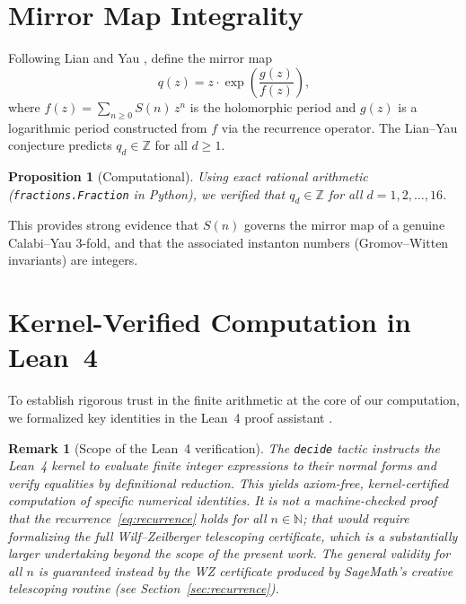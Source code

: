 \documentclass[11pt, a4paper]{article}
\newtheorem{proposition}[theorem]{Proposition}
\newtheorem{remark}[theorem]{Remark}
\begin{document}
\section{Mirror Map Integrality}\label{sec:mirrormap}

Following Lian and Yau \cite{LianYau1996}, define the mirror map
\[
  q(z) = z\cdot\exp\!\left(\frac{g(z)}{f(z)}\right),
\]
where $f(z)=\sum_{n\ge0}S(n)\,z^n$ is the holomorphic period and $g(z)$
is a logarithmic period constructed from $f$ via the recurrence operator.
The Lian--Yau conjecture predicts $q_d\in\mathbb{Z}$ for all $d\ge1$.

\begin{proposition}[Computational]\label{prop:integrality}
Using exact rational arithmetic (\texttt{fractions.Fraction} in Python),
we verified that $q_d\in\mathbb{Z}$ for all $d=1,2,\dots,16$.
\end{proposition}

This provides strong evidence that $S(n)$ governs the mirror map of a
genuine Calabi--Yau 3-fold, and that the associated instanton numbers
(Gromov--Witten invariants) are integers.


\section{Kernel-Verified Computation in Lean~4}\label{sec:lean4}

To establish rigorous trust in the finite arithmetic at the core of our
computation, we formalized key identities in the Lean~4 proof assistant
\cite{deMoura2021}.

\begin{remark}[Scope of the Lean~4 verification]\label{rmk:scope}
The \texttt{decide} tactic instructs the Lean~4 kernel to evaluate finite
integer expressions to their normal forms and verify equalities by
definitional reduction.  This yields \emph{axiom-free, kernel-certified
computation} of specific numerical identities.  It is \emph{not} a
machine-checked proof that the recurrence~\eqref{eq:recurrence} holds
for all $n\in\mathbb{N}$; that would require formalizing the full
Wilf--Zeilberger telescoping certificate, which is a substantially larger
undertaking beyond the scope of the present work.  The general validity for
all $n$ is guaranteed instead by the WZ certificate produced by SageMath's
creative telescoping routine (see Section~\ref{sec:recurrence}).
\end{remark}
\end{document}
